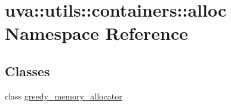 \hypertarget{namespaceuva_1_1utils_1_1containers_1_1alloc}{}\section{uva\+:\+:utils\+:\+:containers\+:\+:alloc Namespace Reference}
\label{namespaceuva_1_1utils_1_1containers_1_1alloc}
\subsection*{Classes}
\begin{DoxyCompactItemize}
\item 
class \hyperlink{classuva_1_1utils_1_1containers_1_1alloc_1_1greedy__memory__allocator}{greedy\+\_\+memory\+\_\+allocator}
\end{DoxyCompactItemize}
